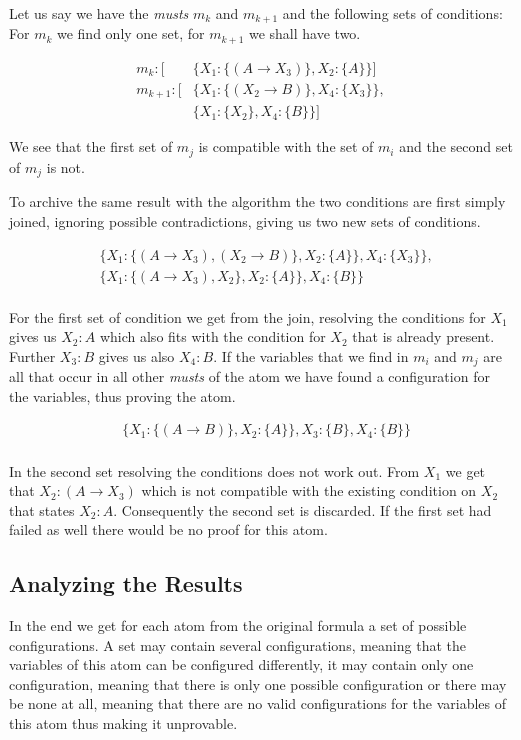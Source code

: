 Let us say we have the \emph{musts} $m_k$ and $m_{k+1}$ and the following sets of conditions: For $m_k$ we find only one set, for $m_{k+1}$ we shall have two.


\begin{align*}
	m_k: [	& \{X_1: \{(A \rightarrow X_3)\}, X_2: \{A\}\}]\\
	m_{k+1}: [	& \{X_1: \{(X_2 \rightarrow B)\}, X_4: \{X_3\}\},\\
			& \{X_1: \{X_2\}, X_4: \{B\}\}]
\end{align*}

We see that the first set of $m_j$ is compatible with the set of $m_i$ and the second set of $m_j$ is not.

To archive the same result with the algorithm the two conditions are first simply joined, ignoring possible contradictions, giving us two new sets of conditions.

\begin{align*}
	& \{	X_1: \{(A \rightarrow X_3), (X_2 \rightarrow B)\}, 
						X_2: \{A\}\}, 
						X_4: \{X_3\}\},\\
					& \{X_1: \{(A \rightarrow X_3), X_2\},
						X_2: \{A\}\}, 
						X_4: \{B\}\}\\
\end{align*}



For the first set of condition we get from the join, resolving the conditions for $X_1$ gives us $X_2:A$ which also fits with the condition for $X_2$ that is already present. Further $X_3: B$ gives us also $X_4: B$. If the variables that we find in $m_i$ and $m_j$ are all that occur in all other \emph{musts} of the atom we have found a configuration for the variables, thus proving the atom.

\begin{align*}
	& \{X_1: \{(A \rightarrow B)\}, X_2: \{A\}\}, X_3: \{B\}, X_4: \{B\}\}\\
\end{align*}

In the second set resolving the conditions does not work out. From $X_1$ we get that $X_2: (A \rightarrow X_3)$ which is not compatible with the existing condition on $X_2$ that states $X_2: A$. Consequently the second set is discarded. If the first set had failed as well there would be no proof for this atom.


\subsection{Analyzing the Results}
In the end we get for each atom from the original formula a set of possible configurations. A set may contain several configurations, meaning that the variables of this atom can be configured differently, it may contain only one configuration, meaning that there is only one possible configuration or there may be none at all, meaning that there are no valid configurations for the variables of this atom thus making it unprovable.

